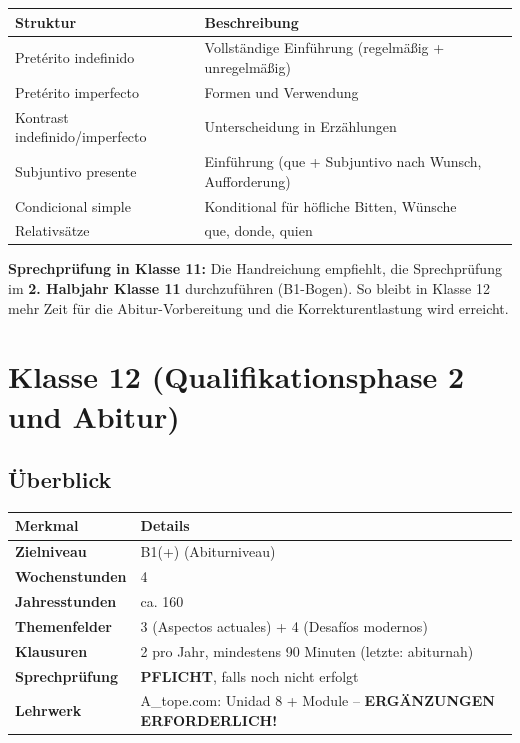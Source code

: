 \documentclass[10pt,a4paper]{article}
\begin{document}
\begin{center}
\begin{tabular}{|l|p{9cm}|}
\hline
\rowcolor{lightgray}
\textbf{Struktur} & \textbf{Beschreibung} \\
\hline
Pretérito indefinido & Vollständige Einführung (regelmäßig + unregelmäßig) \\
\hline
Pretérito imperfecto & Formen und Verwendung \\
\hline
Kontrast indefinido/imperfecto & Unterscheidung in Erzählungen \\
\hline
Subjuntivo presente & Einführung (que + Subjuntivo nach Wunsch, Aufforderung) \\
\hline
Condicional simple & Konditional für höfliche Bitten, Wünsche \\
\hline
Relativsätze & que, donde, quien \\
\hline
\end{tabular}
\end{center}

\begin{empfehlungbox}
\textbf{Sprechprüfung in Klasse 11:} Die Handreichung empfiehlt, die Sprechprüfung im \textbf{2. Halbjahr Klasse 11} durchzuführen (B1-Bogen). So bleibt in Klasse 12 mehr Zeit für die Abitur-Vorbereitung und die Korrekturentlastung wird erreicht.
\end{empfehlungbox}

\newpage

\section{Klasse 12 (Qualifikationsphase 2 und Abitur)}

\subsection{Überblick}

\begin{center}
\begin{tabular}{|p{4cm}|p{9.5cm}|}
\hline
\rowcolor{spaet}\color{white}\textbf{Merkmal} & \color{white}\textbf{Details} \\
\hline
\textbf{Zielniveau} & B1(+) (Abiturniveau) \\
\hline
\textbf{Wochenstunden} & 4 \\
\hline
\textbf{Jahresstunden} & ca. 160 \\
\hline
\textbf{Themenfelder} & 3 (Aspectos actuales) + 4 (Desafíos modernos) \\
\hline
\textbf{Klausuren} & 2 pro Jahr, mindestens 90 Minuten (letzte: abiturnah) \\
\hline
\textbf{Sprechprüfung} & \textbf{PFLICHT}, falls noch nicht erfolgt \\
\hline
\textbf{Lehrwerk} & A\_tope.com: Unidad 8 + Module -- \textcolor{spanisch}{\textbf{ERGÄNZUNGEN ERFORDERLICH!}} \\
\hline
\end{tabular}
\end{center}
\end{document}
